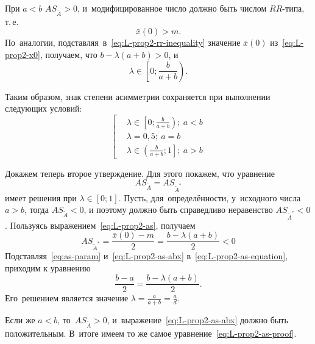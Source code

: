 При $a<b$ $AS_{\tilde A}>0$, и~модифицированное число должно быть числом $RR$-типа, т.\,е.
\begin{equation}
\label{eq:L-prop2-rr-inequality}
  \bar{x}\left( 0 \right)>m.
\end{equation}
По~аналогии, подставляя~в~\eqref{eq:L-prop2-rr-inequality} значение $\bar{x}\left( 0 \right)$ из~\eqref{eq:L-prop2-x0}, получаем, что $b-\lambda \left( a+b \right)>0$, и 
\begin{equation*}
  \lambda \in \left[ 0;\frac{b}{a+b} \right).
\end{equation*}

Таким образом, знак степени асимметрии сохраняется при выполнении следующих условий:
\begin{equation*}
  \left[ \begin{aligned}
    & \lambda \in \left[ 0;\frac{b}{a+b} \right);\ a<b \\ 
    & \lambda =0,5;\ a=b \\ 
    & \lambda \in \left( \frac{b}{a+b};1 \right];\ a>b
  \end{aligned} \right.
\end{equation*}

Докажем теперь второе утверждение. Для этого покажем, что уравнение
\begin{equation}
\label{eq:L-prop2-as-equation}
  A{{S}_{{\tilde{A}}}}=A{{S}_{{{{\tilde{A}}}^{*}}}}
\end{equation}
имеет решения при $\lambda \in \left[ 0;1 \right]$. Пусть, для~определённости, у~исходного числа $a>b$, тогда $AS_{\tilde A}<0$, и поэтому должно быть справедливо неравенство $AS_{\tilde A^{*}}<0$. Пользуясь выражением~\eqref{eq:L-prop2-as}, получаем
\begin{equation}
\label{eq:L-prop2-as-abx}
  A{{S}_{{{{\tilde{A}}}^{*}}}}=\frac{\bar{x}\left( 0 \right)-m}{2}=\frac{b-\lambda \left( a+b \right)}{2}<0
\end{equation}
Подставляя~\eqref{eq:as-param} и~\eqref{eq:L-prop2-as-abx} в~\eqref{eq:L-prop2-as-equation}, приходим к уравнению
\begin{equation}
\label{eq:L-prop2-as-proof}
  \frac{b-a}{2}=\frac{b-\lambda \left( a+b \right)}{2}.
\end{equation}
Его~решением является значение $\displaystyle \lambda =\frac{a}{a+b}=\frac{a}{d}$.

Если же $a<b$, то~$AS_{\tilde A}>0$, и~выражение~\eqref{eq:L-prop2-as-abx} должно быть положительным. В~итоге имеем то же самое уравнение~\eqref{eq:L-prop2-as-proof}.

